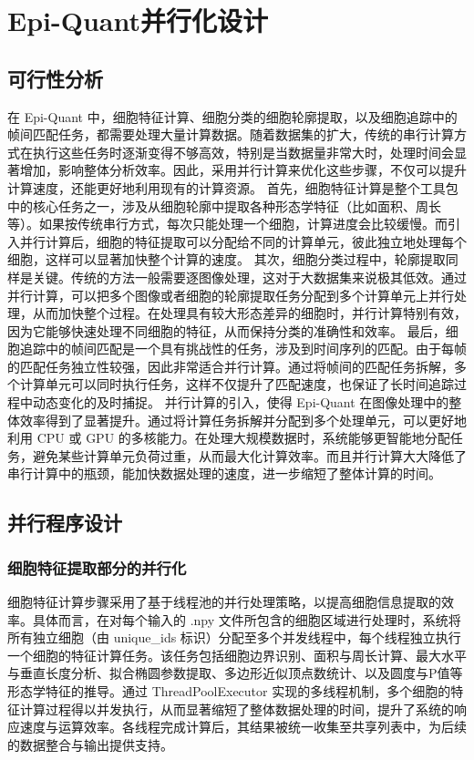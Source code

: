 \section{Epi-Quant并行化设计}
\subsection{可行性分析}
在 Epi-Quant 中，细胞特征计算、细胞分类的细胞轮廓提取，以及细胞追踪中的帧间匹配任务，都需要处理大量计算数据。随着数据集的扩大，传统的串行计算方式在执行这些任务时逐渐变得不够高效，特别是当数据量非常大时，处理时间会显著增加，影响整体分析效率。因此，采用并行计算来优化这些步骤，不仅可以提升计算速度，还能更好地利用现有的计算资源\cite{ref14}。
首先，细胞特征计算是整个工具包中的核心任务之一，涉及从细胞轮廓中提取各种形态学特征（比如面积、周长等）。如果按传统串行方式，每次只能处理一个细胞，计算进度会比较缓慢。而引入并行计算后，细胞的特征提取可以分配给不同的计算单元，彼此独立地处理每个细胞，这样可以显著加快整个计算的速度。
其次，细胞分类过程中，轮廓提取同样是关键。传统的方法一般需要逐图像处理，这对于大数据集来说极其低效。通过并行计算，可以把多个图像或者细胞的轮廓提取任务分配到多个计算单元上并行处理，从而加快整个过程。在处理具有较大形态差异的细胞时，并行计算特别有效，因为它能够快速处理不同细胞的特征，从而保持分类的准确性和效率。
最后，细胞追踪中的帧间匹配是一个具有挑战性的任务，涉及到时间序列的匹配。由于每帧的匹配任务独立性较强，因此非常适合并行计算。通过将帧间的匹配任务拆解，多个计算单元可以同时执行任务，这样不仅提升了匹配速度，也保证了长时间追踪过程中动态变化的及时捕捉。
并行计算的引入，使得 Epi-Quant 在图像处理中的整体效率得到了显著提升。通过将计算任务拆解并分配到多个处理单元，可以更好地利用 CPU 或 GPU 的多核能力。在处理大规模数据时，系统能够更智能地分配任务，避免某些计算单元负荷过重，从而最大化计算效率。而且并行计算大大降低了串行计算中的瓶颈，能加快数据处理的速度，进一步缩短了整体计算的时间。
\subsection{并行程序设计}
\subsubsection{细胞特征提取部分的并行化}
细胞特征计算步骤采用了基于线程池的并行处理策略，以提高细胞信息提取的效率。具体而言，在对每个输入的 .npy 文件所包含的细胞区域进行处理时，系统将所有独立细胞（由 unique\_ids 标识）分配至多个并发线程中，每个线程独立执行一个细胞的特征计算任务。该任务包括细胞边界识别、面积与周长计算、最大水平与垂直长度分析、拟合椭圆参数提取、多边形近似顶点数统计、以及圆度与P值等形态学特征的推导。通过 ThreadPoolExecutor 实现的多线程机制，多个细胞的特征计算过程得以并发执行，从而显著缩短了整体数据处理的时间，提升了系统的响应速度与运算效率。各线程完成计算后，其结果被统一收集至共享列表中，为后续的数据整合与输出提供支持。
